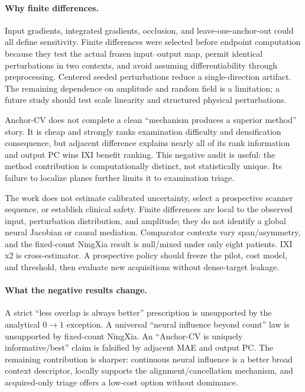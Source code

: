 \documentclass[10pt,twocolumn,letterpaper]{article}
\begin{document}
\paragraph{Why finite differences.} Input gradients, integrated gradients, occlusion, and leave-one-anchor-out could all define sensitivity. Finite differences were selected before endpoint computation because they test the actual frozen input--output map, permit identical perturbations in two contexts, and avoid assuming differentiability through preprocessing. Centered seeded perturbations reduce a single-direction artifact. The remaining dependence on amplitude and random field is a limitation; a future study should test scale linearity and structured physical perturbations.

Anchor-CV does not complete a clean ``mechanism produces a superior method'' story. It is cheap and strongly ranks examination difficulty and densification consequence, but adjacent difference explains nearly all of its rank information and output PC wins IXI benefit ranking. This negative audit is useful: the method contribution is computationally distinct, not statistically unique. Its failure to localize planes further limits it to examination triage.

The work does not estimate calibrated uncertainty, select a prospective scanner sequence, or establish clinical safety. Finite differences are local to the observed input, perturbation distribution, and amplitude; they do not identify a global neural Jacobian or causal mediation. Comparator contexts vary span/asymmetry, and the fixed-count NingXia result is null/mixed under only eight patients. IXI x2 is cross-estimator. A prospective policy should freeze the pilot, cost model, and threshold, then evaluate new acquisitions without dense-target leakage.

\paragraph{What the negative results change.} A strict ``less overlap is always better'' prescription is unsupported by the analytical $0\rightarrow1$ exception. A universal ``neural influence beyond count'' law is unsupported by fixed-count NingXia. An ``Anchor-CV is uniquely informative/best'' claim is falsified by adjacent MAE and output PC. The remaining contribution is sharper: continuous neural influence is a better broad context descriptor, locally supports the alignment/cancellation mechanism, and acquired-only triage offers a low-cost option without dominance.
\end{document}
